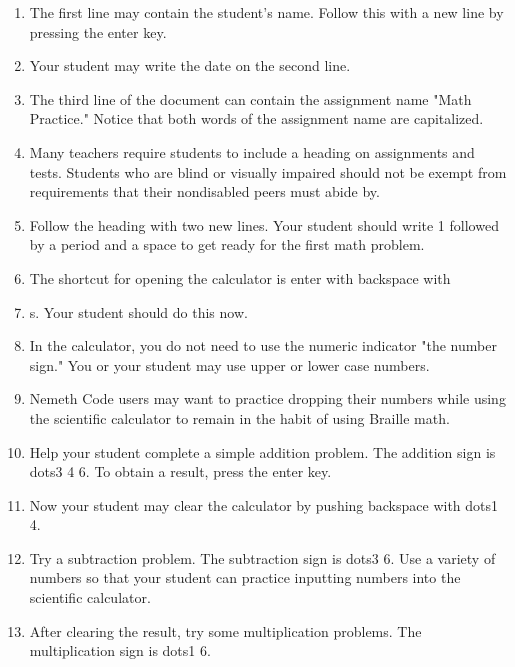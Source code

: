 \documentclass[10pt,letterpaper,twoside]{report}
\begin{document}
{{{{\begin{enumerate}
	\item The first line may contain the student's name.  Follow this with a new line by pressing the enter key.
	      
	\item Your student may write the date on the second line.
	      
	\item The third line of the document can contain the assignment name "Math Practice." Notice that both words of the assignment name are capitalized.
	      
	\item Many teachers require students to include a heading on assignments and tests.  Students who are blind or visually impaired should not be exempt from requirements that their nondisabled peers must abide by.
	      
	\item Follow the heading with two new lines.  Your student should write 1 followed by a period and a space to get ready for the first math problem.
	      
	\item The shortcut for opening the calculator is enter with backspace with
	      
	\item s. Your student should do this now.
	      
	\item In the calculator, you do not need to use the numeric indicator "the number sign." You or your student may use upper or lower case numbers.
	      
	\item Nemeth Code users may want to practice dropping their numbers while using the scientific calculator to remain in the habit of using Braille math.
	      
	\item Help your student complete a simple addition problem.  The addition sign is dots3 4 6.  To obtain a result, press the enter key.
	      
	\item Now your student may clear the calculator by pushing backspace with dots1 4.
	      
	\item Try a subtraction problem.  The subtraction sign is dots3 6.  Use a variety of numbers so that your student can practice inputting numbers into the scientific calculator.
	      
	\item After clearing the result, try some multiplication problems.  The multiplication sign is dots1 6.
	      

\end{enumerate}}}}}
\end{document}
